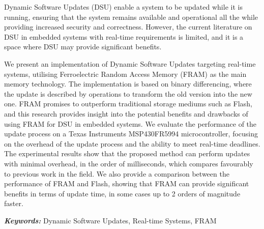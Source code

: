 Dynamic Software Updates (DSU) enable a system to be updated while it is running, ensuring that the system remains available and operational all the while providing increased security and correctness. However, the current literature on DSU in embedded systems with real-time requirements is limited, and it is a space where DSU may provide significant benefits. 

We present an implementation of Dynamic Software Updates targeting real-time systems, utilising Ferroelectric Random Access Memory (FRAM) as the main memory technology. The implementation is based on binary differencing, where the update is described by operations to transform the old version into the new one. FRAM promises to outperform traditional storage mediums such as Flash, and this research provides insight into the potential benefits and drawbacks of using FRAM for DSU in embedded systems. We evaluate the performance of the update process on a Texas Instruments MSP430FR5994 microcontroller, focusing on the overhead of the update process and the ability to meet real-time deadlines. The experimental results show that the proposed method can perform updates with minimal overhead, in the order of milliseconds, which compares favourably to previous work in the field. We also provide a comparison between the performance of FRAM and Flash, showing that FRAM can provide significant benefits in terms of update time, in some cases up to 2 orders of magnitude faster.


\textbf{\textit{Keywords:}} Dynamic Software Updates, Real-time Systems, FRAM
